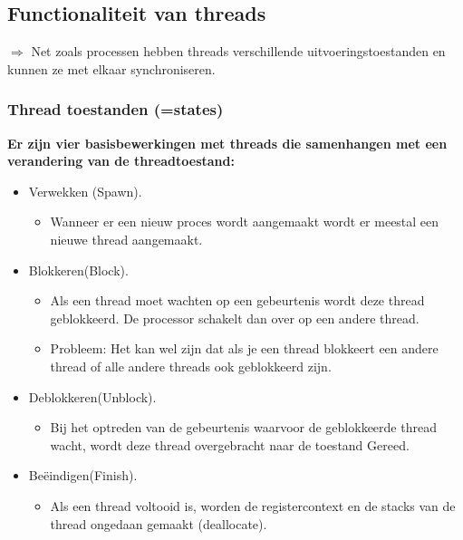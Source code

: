 \subsection{Functionaliteit van threads}

\noindent $\Rightarrow$ Net zoals processen hebben threads  verschillende uitvoeringstoestanden en kunnen ze met elkaar synchroniseren.

\subsubsection{Thread toestanden (=states)}

\textbf{Er zijn vier basisbewerkingen met threads die samenhangen met een verandering van de threadtoestand:}

\begin{itemize}
    \item Verwekken (Spawn).
        \begin{itemize}
        \item Wanneer er een nieuw proces wordt aangemaakt wordt er meestal een nieuwe thread aangemaakt.
        \end{itemize}
    \item Blokkeren(Block). 
        \begin{itemize}
        \item Als een thread moet wachten op een gebeurtenis wordt deze thread geblokkeerd. De processor schakelt dan over op een andere thread. 
        \item Probleem: Het kan wel zijn dat als je een thread blokkeert een andere thread of alle andere threads ook geblokkeerd zijn.
        \end{itemize} 
    \item Deblokkeren(Unblock). 
        \begin{itemize}
        \item Bij het optreden van de gebeurtenis waarvoor de geblokkeerde thread wacht, wordt deze thread overgebracht naar de toestand Gereed.
        \end{itemize}
    \item Beëindigen(Finish).
        \begin{itemize}
        \item Als een thread voltooid is, worden de registercontext en de stacks van de thread ongedaan gemaakt (deallocate).
        \end{itemize}
\end{itemize}

